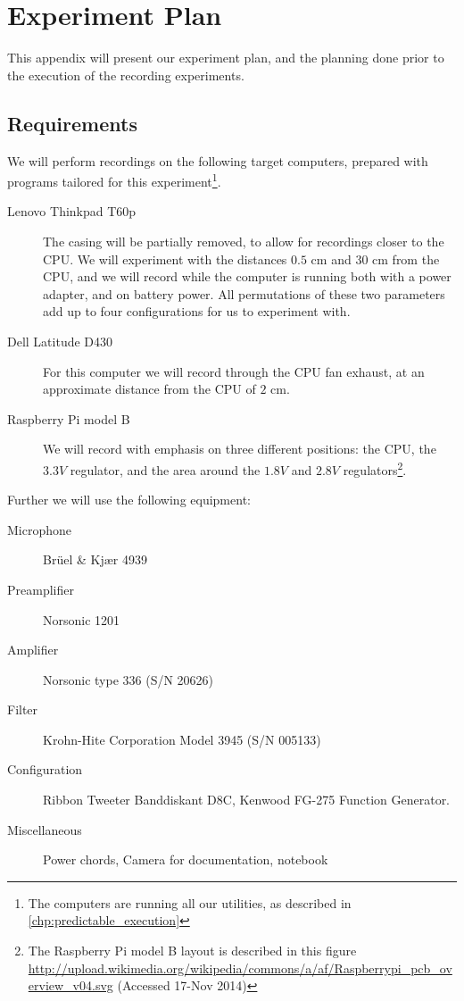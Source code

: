 \chapter{Experiment Plan}\label{apx:experiment_plan}
This appendix will present our experiment plan, and the planning done prior to the execution of the recording experiments.

\section{Requirements}

We will perform recordings on the following target computers, prepared with programs tailored for this experiment\footnote{The computers are running all our utilities, as described in \autoref{chp:predictable_execution}}.
\begin{description}
	\item[Lenovo Thinkpad T60p] The casing will be partially removed, to allow for recordings closer to the CPU. We will experiment with the distances $0.5$ cm and $30$ cm from the CPU, and we will record while the computer is running both with a power adapter, and on battery power. All permutations of these two parameters add up to four configurations for us to experiment with.
	\item[Dell Latitude D430] For this computer we will record through the CPU fan exhaust, at an approximate distance from the CPU of $2$ cm.
	\item[Raspberry Pi model B] We will record with emphasis on three different positions: the CPU, the $3.3V$ regulator, and the area around the $1.8V$ and $2.8V$ regulators\footnote{The Raspberry Pi model B layout is described in this figure \url{http://upload.wikimedia.org/wikipedia/commons/a/af/Raspberrypi_pcb_overview_v04.svg} (Accessed 17-Nov 2014)}.
\end{description}

Further we will use the following equipment:
\begin{description}
	\item[Microphone] Brüel \& Kjær 4939
	\item[Preamplifier] Norsonic 1201
	\item[Amplifier] Norsonic type 336 (S/N 20626)
	\item[Filter] Krohn-Hite Corporation Model 3945 (S/N 005133)
	\item[Configuration] Ribbon Tweeter Banddiskant D8C, Kenwood FG-275 Function Generator.
	\item[Miscellaneous] Power chords, Camera for documentation, notebook
\end{description}

